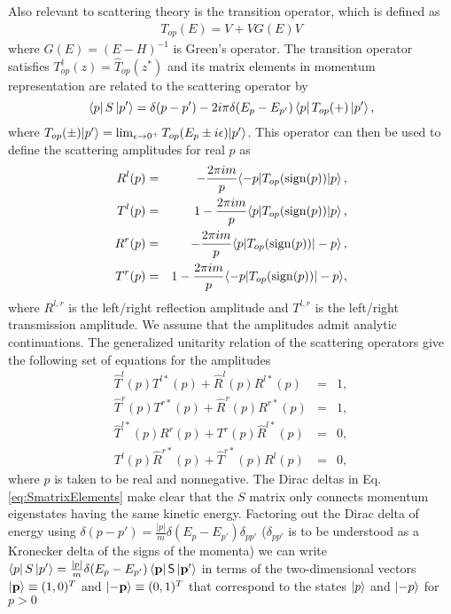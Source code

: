 Also relevant to scattering theory is the transition operator, which is defined as
%
\begin{eqnarray}
T_{op}(E)=V+VG(E)V
\end{eqnarray}
%
where $G(E)=(E-H)^{-1}$ is Green's operator. The transition operator satisfies $T^{\dagger}_{op}(z)=\widehat{T}_{op}(z^*)$ and its matrix elements in momentum representation are related to the  scattering operator by
%
\begin{equation}
    \bra{p} S \ket{p'} = \delta (p-p') -2 i \pi \delta (E_p-E_{p'}) \bra{p}T_{op}(+)\ket{p'},
    \label{eq:SmatrixElements}
\end{equation}
%
where  $T_{op}(\pm)|p'\rangle=\lim_{\epsilon\to0^+} T_{op}(E_p\pm i\epsilon)|p'\rangle$. This operator can then be used to define the scattering amplitudes
for real $p$ as
%
\begin{eqnarray}\label{art}
R^l(p)&=&-\frac{2\pi im}{p} \la -p|T_{op}({\rm sign}(p))|p\ra\,, \nonumber\\
T^l(p)&=&1-\frac{2\pi im}{p} \la p|T_{op}({\rm sign}(p))|p\ra\,, \nonumber\\
R^r(p)&=&-\frac{2\pi im}{p} \la p|T_{op}({\rm sign}(p))|-p\ra\,, \nonumber\\
T^r(p)&=&1-\frac{2\pi im}{p} \la -p|T_{op}({\rm sign}(p))|-p\ra,
\end{eqnarray}
%
where $R^{l,r}$ is the left/right reflection amplitude and $T^{l,r}$ is the left/right transmission amplitude. We assume that the amplitudes admit analytic continuations. The generalized unitarity relation of the scattering operators give the following set of equations for the amplitudes
%
\begin{eqnarray}
    \widehat T^l(p) T^{l*}(p) + \widehat R^l(p) R^{l*}(p) &=& 1,
    \nonumber\\
    \widehat T^r(p) T^{r*}(p) + \widehat R^r(p) R^{r*}(p) &=& 1,
    \nonumber\\
    \hat T^{l*}(p) R^r(p) + T^r(p) \widehat R^{l*}(p) &=& 0,
    \nonumber\\
    T^l(p) \widehat R^{r*}(p) + \widehat T^{r*}(p) R^l(p) &=& 0,
    \label{gurAmplitudes}
\end{eqnarray}
%
where $p$ is taken to be real and nonnegative. The Dirac deltas in Eq. \eqref{eq:SmatrixElements} make clear that the $S$ matrix only connects momentum eigenstates having the same kinetic energy. Factoring out the Dirac delta of energy using $\delta(p-p') = \frac{|p|}{m}\delta(E_p-E_{p'})\delta_{pp'}$ ($\delta_{pp'}$ is to be understood as a Kronecker delta of the signs of the momenta) we can write $\bra{p} S \ket{p'} = \frac{|p|}{m}\delta(E_p-E_{p'})\bra{\mathbf{p}} \mathsf{S} \ket{\mathbf{p'}}$ in terms of the two-dimensional vectors $\ket{\mathbf{p}}\equiv (1,0)^T$ and $\ket{-\mathbf{p}}\equiv (0,1)^T$ that correspond to the states $\ket{p}$ and $\ket{-p}$ for $p > 0$
